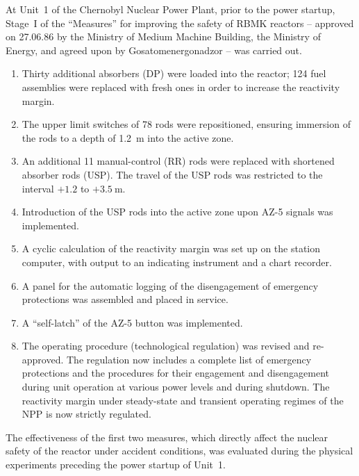 \documentclass[openright]{bookest}
\begin{document}
\medskip

At Unit~1 of the Chernobyl Nuclear Power Plant, prior to the power startup, Stage~I of the ``Measures'' for improving the safety of RBMK reactors -- approved on 27.06.86 by the Ministry of Medium Machine Building, the Ministry of Energy, and agreed upon by Gosatomenergonadzor -- was carried out.

\begin{enumerate}
\item Thirty additional absorbers (DP) were loaded into the reactor; 124 fuel assemblies were replaced with fresh ones in order to increase the reactivity margin.

\item The upper limit switches of 78 rods were repositioned, ensuring immersion of the rods to a depth of \qty{1.2}{\metre} into the active zone.

\item An additional 11 manual-control (RR) rods were replaced with shortened absorber rods (USP). The travel of the USP rods was restricted to the interval $+1.2$ to $+\qty{3.5}{\metre}$.

\item Introduction of the USP rods into the active zone upon AZ-5 signals was implemented.

\item A cyclic calculation of the reactivity margin was set up on the station computer, with output to an indicating instrument and a chart recorder.

\item A panel for the automatic logging of the disengagement of emergency protections was assembled and placed in service.

\item A ``self-latch'' of the AZ-5 button was implemented.

\item The operating procedure (technological regulation) was revised and re-approved. The regulation now includes a complete list of emergency protections and the procedures for their engagement and disengagement during unit operation at various power levels and during shutdown. The reactivity margin under steady-state and transient operating regimes of the NPP is now strictly regulated.
\end{enumerate}

The effectiveness of the first two measures, which directly affect the nuclear safety of the reactor under accident conditions, was evaluated during the physical experiments preceding the power startup of Unit~1.
\end{document}
